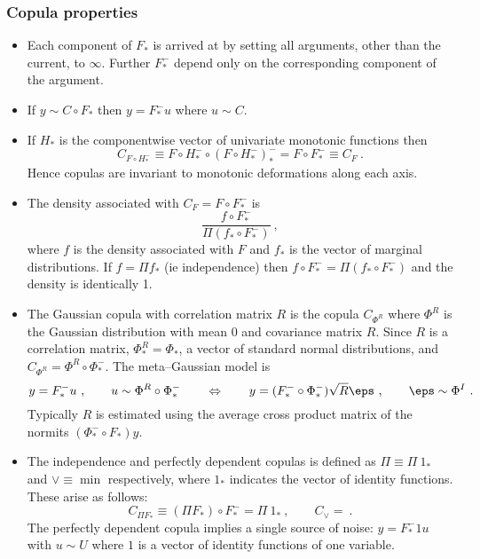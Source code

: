 \subsubsection{Copula properties} 
\begin{itemize}
    \item  Each component of $F_*$ is arrived at by setting all arguments, other than the current, to $\infty$.  Further
     $F_*^-$ depend only on the corresponding component of the argument.
     \item If $y\sim C\circ F_*$ then $y=F_*^-u$ where $u\sim C$.
    \item  If $H_*$ is the componentwise  vector of univariate monotonic functions then
$$
C_{F\circ H_*^-}\equiv F\circ H_*^- \circ(F\circ H_*^-)_*^-=F \circ F_*^-\equiv C_F\ .
$$
Hence copulas are invariant to monotonic deformations along each axis. 
    \item The density associated with $C_F=F\circ F_*^-$ is
    $$
    \frac{f\circ F_*^-}{\Pi (f_*\circ F_*^-)}\ ,
    $$
    where $f$ is the density associated with $F$ and $f_*$ is the vector of marginal distributions.  If $f=\Pi f_*$ (ie independence) then $f\circ F_*^-=\Pi (f_*\circ F_*^-)$ and the density is identically 1.
    \item The Gaussian copula with correlation matrix $R$ is the copula $C_{\Phi^R}$  where $\Phi^R$ is the Gaussian distribution with mean 0 and covariance matrix $R$.   Since $R$ is a correlation matrix, $\Phi^R_*=\Phi_*$, a vector of standard normal distributions, and $C_{\Phi^R}=\Phi^R\circ \Phi_*^-$.   The meta--Gaussian model is
\begin{equation}\label{metaG}
y = F_*^-u\ , \qquad u\sim\Phi^R\circ\Phi_*^-\qquad\Leftrightarrow\qquad y =(F_*^-\circ\Phi_*^-)\sqrt{R}\eps\ , \qquad \eps\sim \Phi^I\ .
\end{equation}
Typically $R$ is estimated using the average cross product matrix of  the normits  $(\Phi_*^-\circ F_*) y$.
   
\item The independence and perfectly dependent copulas is defined as $\Pi\equiv\Pi\ 1_*$ and $\vee\equiv\min$ respectively, where $1_*$ indicates the vector of identity functions.  These arise as follows:
$$
C_{\Pi F_*}\equiv(\Pi F_*)\circ F_*^-= \Pi\ 1_*\ ,\qquad C_{\vee}=\ .
$$
The perfectly dependent copula implies a single source of noise: 
$y=F_*^-1u$ with $u\sim U$
where $1$ is a vector of  identity functions of one variable.
\end{itemize}

